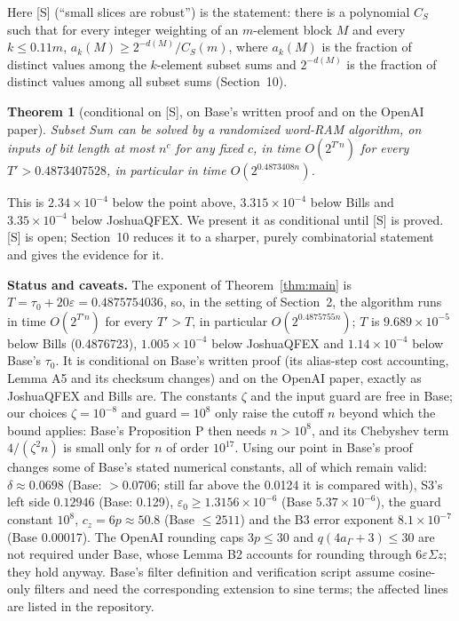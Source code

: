 \documentclass[11pt]{article}
\newcommand{\eps}{\varepsilon}
\theoremstyle{plain}
\newtheorem{theorem}{Theorem}
\begin{document}
Here [S] (``small slices are robust'') is the statement: there is a polynomial $C_S$ such that for every integer weighting of an $m$-element block $M$ and every $k \le 0.11m$, $a_k(M) \ge 2^{-d(M)}/C_S(m)$, where $a_k(M)$ is the fraction of distinct values among the $k$-element subset sums and $2^{-d(M)}$ is the fraction of distinct values among all subset sums (Section~10).

\begin{theorem}[conditional on {[S]}, on Base's written proof and on the OpenAI paper]\label{thm:ternary}
Subset Sum can be solved by a randomized word-RAM algorithm, on inputs of bit length at most $n^c$ for any fixed $c$, in time $O(2^{T' n})$ for every $T' > 0.4873407528$, in particular in time $O(2^{0.4873408n})$.
\end{theorem}

This is $2.34\times10^{-4}$ below the point above, $3.315\times10^{-4}$ below Bills and $3.35\times10^{-4}$ below JoshuaQFEX. We present it as conditional until [S] is proved. [S] is open; Section~10 reduces it to a sharper, purely combinatorial statement and gives the evidence for it.

\textbf{Status and caveats.} The exponent of Theorem~\ref{thm:main} is $T = \tau_0 + 20\eps = 0.4875754036$, so, in the setting of Section~2, the algorithm runs in time $O(2^{T' n})$ for every $T' > T$, in particular $O(2^{0.4875755n})$; $T$ is $9.689\times10^{-5}$ below Bills (0.4876723), $1.005\times10^{-4}$ below JoshuaQFEX and $1.14\times10^{-4}$ below Base's $\tau_0$. It is conditional on Base's written proof (its alias-step cost accounting, Lemma A5 and its checksum changes) and on the OpenAI paper, exactly as JoshuaQFEX and Bills are. The constants $\zeta$ and the input guard are free in Base; our choices $\zeta=10^{-8}$ and $\mathrm{guard}=10^8$ only raise the cutoff $n$ beyond which the bound applies: Base's Proposition P then needs $n > 10^8$, and its Chebyshev term $4/(\zeta^2 n)$ is small only for $n$ of order $10^{17}$. Using our point in Base's proof changes some of Base's stated numerical constants, all of which remain valid: $\delta\approx0.0698$ (Base: $> 0.0706$; still far above the 0.0124 it is compared with), S3's left side $0.12946$ (Base: 0.129), $\eps_0 \ge 1.3156\times10^{-6}$ (Base $5.37\times10^{-6}$), the guard constant $10^8$, $c_z = 6p \approx 50.8$ (Base $\le 2511$) and the B3 error exponent $8.1\times10^{-7}$ (Base 0.00017). The OpenAI rounding caps $3p \le 30$ and $q(4a_\Gamma + 3) \le 30$ are not required under Base, whose Lemma B2 accounts for rounding through $6\eps\Sigma z$; they hold anyway. Base's filter definition and verification script assume cosine-only filters and need the corresponding extension to sine terms; the affected lines are listed in the repository.
\end{document}
